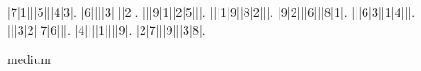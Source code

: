 \begin{sudoku}
|7|1|||5|||4|3|.
|6||||3||||2|.
|||9|1||2|5|||.
|||1|9||8|2|||.
|9|2|||6|||8|1|.
|||6|3||1|4|||.
|||3|2||7|6|||.
|4||||1||||9|.
|2|7|||9|||3|8|.
\end{sudoku}
\begin{center}
medium\end{center}